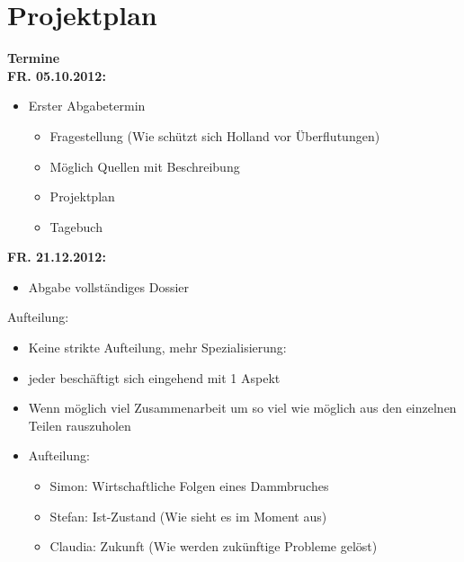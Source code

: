 \part{Projektplan}
\textbf{\large{Termine}}
\\[0.5cm]
\textbf{FR. 05.10.2012:}
\begin{itemize}
	\item Erster Abgabetermin
	\begin{itemize}
	  \item Fragestellung (Wie schützt sich Holland vor Überflutungen)
	  \item Möglich Quellen mit Beschreibung
	  \item Projektplan
	  \item Tagebuch  
	\end{itemize} 
\end{itemize}
\textbf{FR. 21.12.2012:} 
\begin{itemize}
	\item Abgabe vollständiges Dossier
\end{itemize}
Aufteilung:
\begin{itemize}
	\item Keine strikte Aufteilung, mehr Spezialisierung:
	\item jeder beschäftigt sich eingehend mit 1 Aspekt
	\item Wenn möglich viel Zusammenarbeit um so viel wie möglich aus den einzelnen Teilen rauszuholen
	\item Aufteilung:
	\begin{itemize}
		\item Simon:	Wirtschaftliche Folgen eines Dammbruches
		\item Stefan:	Ist-Zustand (Wie sieht es im Moment aus)
		\item Claudia:	Zukunft (Wie werden zukünftige Probleme gelöst)
	\end{itemize}
\end{itemize}

